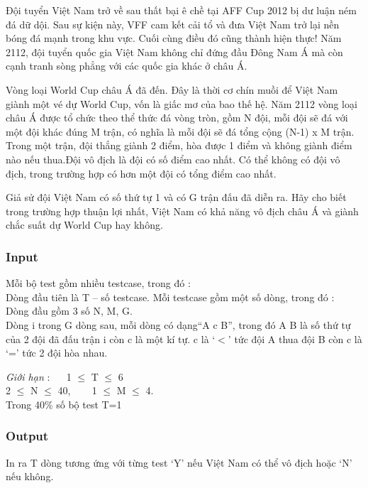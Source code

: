 



\textbf{}   Đội tuyển Việt Nam trở về sau thất bại ê chề tại AFF Cup 2012 bị dư luận ném đá dữ dội. Sau sự kiện này, VFF cam kết cải tổ và đưa Việt Nam trở lại nền bóng đá mạnh trong khu vực. Cuối cùng điều đó cũng thành hiện thực! Năm 2112, đội tuyển quốc gia Việt Nam không chỉ đứng đầu Đông Nam Á mà còn cạnh tranh sòng phẳng với các quốc gia khác ở châu Á.  

   Vòng loại World Cup châu Á đã đến. Đây là thời cơ chín muồi để Việt Nam giành một vé dự World Cup, vốn là giấc mơ của bao thế hệ. Năm 2112 vòng loại châu Á được tổ chức theo thể thức đá vòng tròn, gồm N đội, mỗi đội sẽ đá với một đội khác đúng M trận, có nghĩa là mỗi đội sẽ đá tổng cộng (N-1) x M trận. Trong một trận, đội thắng giành 2 điểm, hòa được 1 điểm và không giành điểm nào nếu thua.Đội vô địch là đội có số điểm cao nhất. Có thể không có đội vô địch, trong trường hợp có hơn một đội có tổng điểm cao nhất.  

   Giả sử đội Việt Nam có số thứ tự 1 và có G trận đấu đã diễn ra. Hãy cho biết trong trường hợp thuận lợi nhất, Việt Nam có khả năng vô địch châu Á và giành chắc suất dự World Cup hay không.  

\subsubsection{   Input  }

   Mỗi bộ test gồm nhiều testcase, trong đó :   \textbf{
\\}   Dòng đầu tiên là T – số testcase. Mỗi testcase gồm một số dòng, trong đó :   
\\   Dòng đầu gồm 3 số N, M, G.   
\\   Dòng i trong G dòng sau, mỗi dòng có dạng“A c B”, trong đó A B là số thứ tự của 2 đội đã đấu trận i còn c là một kí tự. c là ‘$<$’ tức đội A thua đội B còn c là ‘=’ tức 2 đội hòa nhau.  

\emph{    Giới hạn   }   :    1 $\le$  T  $\le$  6   
\\   2  $\le$  N  $\le$  40,     1  $\le$  M  $\le$  4.   
\\   Trong 40\% số bộ test T=1  

\subsubsection{   Output  }

   In ra T dòng tương ứng với từng test ‘Y’ nếu Việt Nam có thể vô địch hoặc ‘N’ nếu không.  


